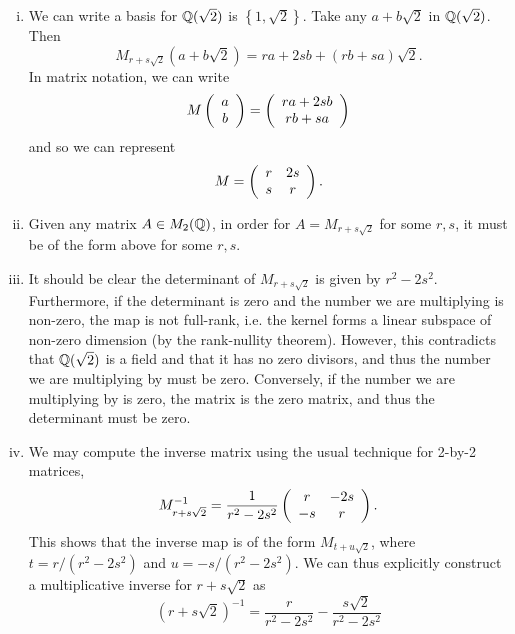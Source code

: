 \documentclass{../../mathnotes}
\begin{document}
\begin{enumerate}[(i)]
    \item We can write a basis for $\mathbb{Q}(\sqrt{2})$ is $\left\{ 1,\sqrt{2} \right\}$. Take any $a+b\sqrt{2}$ in $\mathbb{Q}(\sqrt{2})$.
        Then
        \[M_{r+s\sqrt{2}}(a+b\sqrt{2})=ra+2sb+(rb+sa)\sqrt{2}.\]
        In matrix notation, we can write
        \begin{align*}
           M\left(
           \begin{array}{c}
               a\\
               b
           \end{array}
           \right)=
           \left(
           \begin{array}[]{c}
               ra+2sb\\
               rb+sa
           \end{array}
           \right)
        \end{align*}
        and so we can represent
        \begin{align*}
            M=\left(
            \begin{array}[]{cc}
                r & 2s\\
                s & r
            \end{array}
            \right).
        \end{align*}
    \item Given any matrix $A\in M_2(\mathbb{Q})$, in order for $A=M_{r+s\sqrt{2}}$ for some $r,s$, it must be of the form above
        for some $r,s$.
    \item It should be clear the determinant of $M_{r+s\sqrt{2}}$ is given by $r^2-2s^2$. Furthermore, if the determinant is
        zero and the number we are multiplying is non-zero, the map is not full-rank, i.e. the kernel forms a linear subspace
        of non-zero dimension (by the rank-nullity theorem). However, this contradicts that $\mathbb{Q}(\sqrt{2})$ is a field and that
        it has no zero divisors, and thus the number we are multiplying by must be zero. Conversely, if the number we are
        multiplying by is zero, the matrix is the zero matrix, and thus the determinant must be zero.
    \item We may compute the inverse matrix using the usual technique for 2-by-2 matrices,
        \begin{align*}
            M^{-1}_{r+s\sqrt{2}}=\frac{1}{r^2-2s^2}
            \left( 
            \begin{array}[]{cc}
                r & -2s\\
                -s & r
            \end{array}
            \right).
        \end{align*}
        This shows that the inverse map is of the form $M_{t+u\sqrt{2}}$, where $t=r/(r^2-2s^2)$ and $u=-s/(r^2-2s^2)$.
        We can thus explicitly construct a multiplicative inverse for $r+s\sqrt{2}$ as
        \[(r+s\sqrt{2})^{-1}=\frac{r}{r^2-2s^2}-\frac{s\sqrt{2}}{r^2-2s^2}\]
\end{enumerate}
\end{document}
